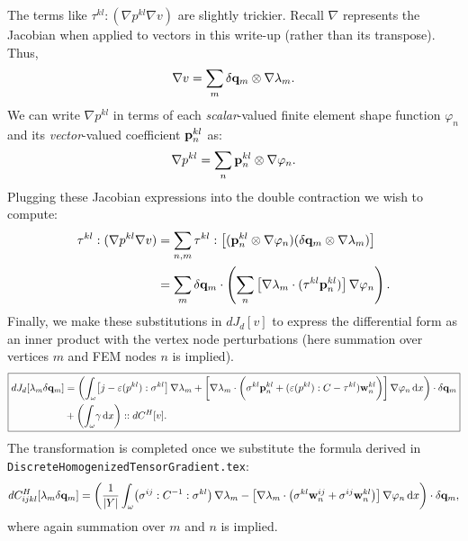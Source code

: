 \documentclass[10pt]{article}
\providecommand{\shape}{\omega}
\providecommand{\vint}[3][x]{\int_{#2} \! #3 \, \mathrm{d}#1}
\renewcommand{\vec}[1]{{\bf #1}}
\def\w{\vec{w}}
\def\p{\vec{p}}
\def\q{\vec{q}}
\def\strain{\varepsilon}
\begin{document}
The terms like $\tau^{kl} : (\nabla p^{kl} \nabla v)$ are slightly trickier.
Recall $\nabla$ represents the Jacobian when applied to vectors in this
write-up (rather than its transpose). Thus,
$$
\nabla v = \sum_m \delta \q_m \otimes \nabla \lambda_m.
$$
We can write $\nabla p^{kl}$ in terms of each {\em scalar}-valued finite element shape
function $\varphi_n$ and its {\em vector}-valued coefficient $\vec{p}^{kl}_n$ as:
$$
\nabla p^{kl} = \sum_n \vec{p}^{kl}_n \otimes \nabla \varphi_n.
$$
Plugging these Jacobian expressions into the double contraction we wish to compute:
\begin{align*}
\tau^{kl} : (\nabla p^{kl} \nabla v)
    &= \sum_{n,m} \tau^{kl} : \left[(\vec{p}^{kl}_n \otimes \nabla \varphi_n) (\delta \q_m \otimes \nabla \lambda_m)\right] \\
    &= \sum_{m} \delta \q_m \cdot
            \left(\sum_n \left[\nabla \lambda_m \cdot (\tau^{kl} \vec{p}^{kl}_n) \right] \nabla \varphi_n\right).
\end{align*}
Finally, we make these substitutions in $dJ_d[v]$ to express the
differential form as an inner product with the vertex node perturbations (here
summation over vertices $m$ and FEM nodes $n$ is implied).
\begin{equation*}
\boxed{
\begin{aligned}
dJ_d[\lambda_m \delta \q_m]
&=
\left(\vint{\shape}{
     \left[j -\strain(p^{kl}) : \sigma^{kl} \right] \nabla \lambda_m 
     + \left[
         \nabla \lambda_m \cdot \bigg(
                \sigma^{kl} \vec{\p}^{kl}_n +
                (\strain(p^{kl}) : C - \tau^{kl}) \w^{kl}_n
        \bigg) \right] \nabla \varphi_n
}\right) \cdot \delta \q_m
\\
&+ \left(\vint{\shape}{\gamma}\right) :: dC^H[v].
\end{aligned}
}
\end{equation*}
The transformation is completed once we substitute the formula derived in
\texttt{DiscreteHomogenizedTensorGradient.tex}:
$$
dC^H_{ijkl}[\lambda_m \delta \q_m] = 
    \left(
        \frac{1}{|Y|} \vint{\omega}{\left(\sigma^{ij} : C^{-1} : \sigma^{kl}\right) \nabla \lambda_m
           - \left[\nabla \lambda_m \cdot \left( \sigma^{kl} \vec{\w}^{ij}_n
                                         + \sigma^{ij} \vec{\w}^{kl}_n
                             \right) \right] \nabla \varphi_n}
    \right) \cdot \delta \q_m,
$$
where again summation over $m$ and $n$ is implied.



\end{document}
